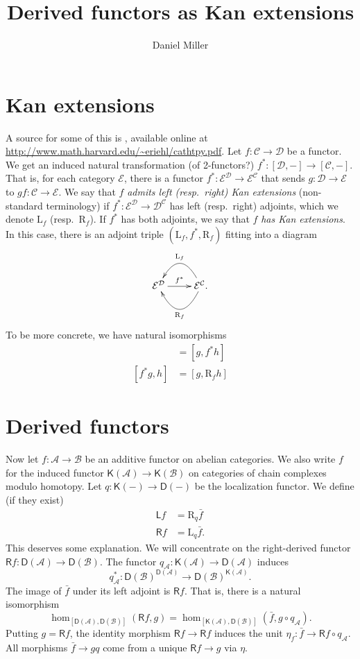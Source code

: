\documentclass{amsart}
\title{Derived functors as Kan extensions}
\author{Daniel Miller}
\newcommand{\cA}{\mathcal{A}}
\newcommand{\cB}{\mathcal{B}}
\newcommand{\cC}{\mathcal{C}}
\newcommand{\cD}{\mathcal{D}}
\newcommand{\cE}{\mathcal{E}}
\newcommand{\eD}{\mathsf{D}}
\newcommand{\eK}{\mathsf{K}}
\newcommand{\eL}{\mathsf{L}}
\newcommand{\eR}{\mathsf{R}}
\newcommand{\lan}{\mathrm{L}}
\newcommand{\ran}{\mathrm{R}}
\begin{document}
\maketitle





\section{Kan extensions}

A source for some of this is \cite{riehl-2014}, available online at 
\url{http://www.math.harvard.edu/~eriehl/cathtpy.pdf}. Let $f:\cC\to \cD$ be a 
functor. We get an induced natural transformation (of 2-functors?) 
$f^\ast:[\cD,-] \to [\cC,-]$. That is, for each category $\cE$, there is a 
functor $f^\ast:\cE^\cD\to \cE^\cC$ that sends $g:\cD\to \cE$ to 
$g f:\cC\to \cE$. We say that $f$ \emph{admits left (resp.~right) Kan 
extensions} (non-standard terminology) if $f^\ast:\cE^\cD\to \cD^\cC$ has 
left (resp.~right) adjoints, which we denote $\lan_f$ (resp.~$\ran_f$). If 
$f^\ast$ has both adjoints, we say that $f$ \emph{has Kan extensions}. In 
this case, there is an adjoint triple $(\lan_f,f^\ast,\ran_f)$ fitting into a 
diagram 
\[\xymatrix{
  \cE^\cD \ar[r]^-{f^\ast} 
    & \cE^\cC .\ar@/^2pc/[l]^{\ran_f} \ar@/_2pc/[l]_{\lan_f}
}\]
To be more concrete, we have natural isomorphisms 
\begin{align*}
  [\lan_f g,h] &= [g,f^\ast h] \\
  [f^\ast g,h] &= [g,\ran_f h] 
\end{align*}





\section{Derived functors}

Now let $f:\cA\to \cB$ be an additive functor on abelian categories. We also 
write $f$ for the induced functor $\eK(\cA) \to \eK(\cB)$ on categories of 
chain complexes modulo homotopy. Let $q:\eK(-)\to \eD(-)$ be the localization 
functor. We define (if they exist) 
\begin{align*}
  \eL f &= \ran_q\bar f \\
  \eR f &= \lan_q \bar f .
\end{align*}
This deserves some explanation. We will concentrate on the right-derived 
functor $\eR f:\eD(\cA) \to \eD(\cB)$. The functor 
$q_\cA:\eK(\cA) \to \eD(\cA)$ induces 
\[
  q_\cA^\ast:\eD(\cB)^{\eD(\cA)} \to \eD(\cB)^{\eK(\cA)} .
\]
The image of $\bar f$ under its left adjoint is $\eR f$. That is, there is a 
natural isomorphism 
\[
  \hom_{[\eD(\cA),\eD(\cB)]}(\eR f,g) = \hom_{[\eK(\cA),\eD(\cB)]}(\bar f, g\circ q_\cA) .
\]
Putting $g=\eR f$, the identity morphism $\eR f\to \eR f$ induces 
the unit $\eta_f:\bar f\to \eR f\circ q_\cA$. All morphisms 
$\bar f\to gq$ come from a unique $\eR f\to g$ via $\eta$. 
\end{document}
